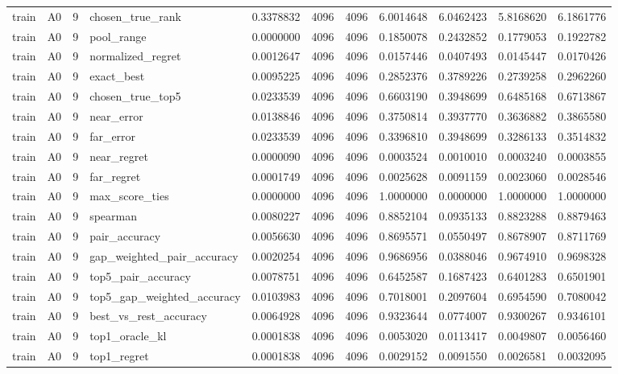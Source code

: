 \begin{tabular}{llrlrrrrrrr}
train & A0 & 9 & chosen_true_rank & 0.3378832 & 4096 & 4096 & 6.0014648 & 6.0462423 & 5.8168620 & 6.1861776 \\
train & A0 & 9 & pool_range & 0.0000000 & 4096 & 4096 & 0.1850078 & 0.2432852 & 0.1779053 & 0.1922782 \\
train & A0 & 9 & normalized_regret & 0.0012647 & 4096 & 4096 & 0.0157446 & 0.0407493 & 0.0145447 & 0.0170426 \\
train & A0 & 9 & exact_best & 0.0095225 & 4096 & 4096 & 0.2852376 & 0.3789226 & 0.2739258 & 0.2962260 \\
train & A0 & 9 & chosen_true_top5 & 0.0233539 & 4096 & 4096 & 0.6603190 & 0.3948699 & 0.6485168 & 0.6713867 \\
train & A0 & 9 & near_error & 0.0138846 & 4096 & 4096 & 0.3750814 & 0.3937770 & 0.3636882 & 0.3865580 \\
train & A0 & 9 & far_error & 0.0233539 & 4096 & 4096 & 0.3396810 & 0.3948699 & 0.3286133 & 0.3514832 \\
train & A0 & 9 & near_regret & 0.0000090 & 4096 & 4096 & 0.0003524 & 0.0010010 & 0.0003240 & 0.0003855 \\
train & A0 & 9 & far_regret & 0.0001749 & 4096 & 4096 & 0.0025628 & 0.0091159 & 0.0023060 & 0.0028546 \\
train & A0 & 9 & max_score_ties & 0.0000000 & 4096 & 4096 & 1.0000000 & 0.0000000 & 1.0000000 & 1.0000000 \\
train & A0 & 9 & spearman & 0.0080227 & 4096 & 4096 & 0.8852104 & 0.0935133 & 0.8823288 & 0.8879463 \\
train & A0 & 9 & pair_accuracy & 0.0056630 & 4096 & 4096 & 0.8695571 & 0.0550497 & 0.8678907 & 0.8711769 \\
train & A0 & 9 & gap_weighted_pair_accuracy & 0.0020254 & 4096 & 4096 & 0.9686956 & 0.0388046 & 0.9674910 & 0.9698328 \\
train & A0 & 9 & top5_pair_accuracy & 0.0078751 & 4096 & 4096 & 0.6452587 & 0.1687423 & 0.6401283 & 0.6501901 \\
train & A0 & 9 & top5_gap_weighted_accuracy & 0.0103983 & 4096 & 4096 & 0.7018001 & 0.2097604 & 0.6954590 & 0.7080042 \\
train & A0 & 9 & best_vs_rest_accuracy & 0.0064928 & 4096 & 4096 & 0.9323644 & 0.0774007 & 0.9300267 & 0.9346101 \\
train & A0 & 9 & top1_oracle_kl & 0.0001838 & 4096 & 4096 & 0.0053020 & 0.0113417 & 0.0049807 & 0.0056460 \\
train & A0 & 9 & top1_regret & 0.0001838 & 4096 & 4096 & 0.0029152 & 0.0091550 & 0.0026581 & 0.0032095 \\

\end{tabular}
